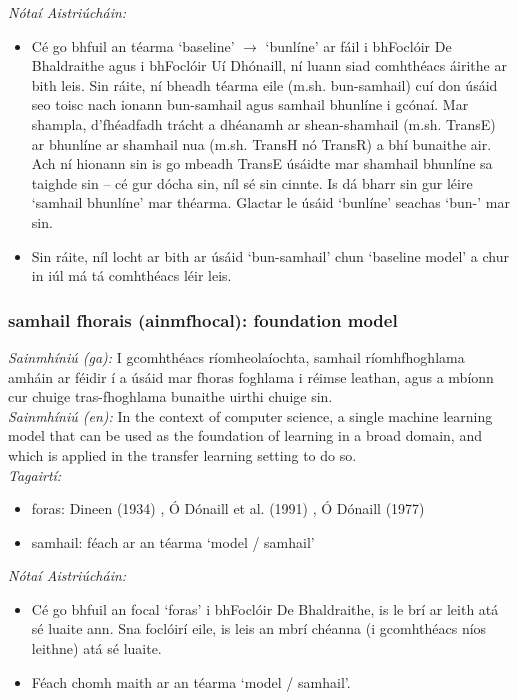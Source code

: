  \noindent \textit{Nótaí Aistriúcháin:}
\begin{itemize}
	\item Cé go bhfuil an téarma `baseline' $\rightarrow$ `bunlíne' ar fáil i bhFoclóir De Bhaldraithe agus i bhFoclóir Uí Dhónaill, ní luann siad comhthéacs áirithe ar bith leis. Sin ráite, ní bheadh téarma eile (m.sh. bun-samhail) cuí don úsáid seo toisc nach ionann bun-samhail agus samhail bhunlíne i gcónaí. Mar shampla, d'fhéadfadh trácht a dhéanamh ar shean-shamhail (m.sh. TransE) ar bhunlíne ar shamhail nua (m.sh. TransH nó TransR) a bhí bunaithe air. Ach ní hionann sin is go mbeadh TransE úsáidte mar shamhail bhunlíne sa taighde sin -- cé gur dócha sin, níl sé sin cinnte. Is dá bharr sin gur léire `samhail bhunlíne' mar théarma. Glactar le úsáid `bunlíne' seachas `bun-' mar sin.
	\item Sin ráite, níl locht ar bith ar úsáid `bun-samhail' chun `baseline model' a chur in iúl má tá comhthéacs léir leis.
\end{itemize}


\subsubsection*{samhail fhorais (ainmfhocal): foundation model}
 \noindent \textit{Sainmhíniú (ga):} I gcomhthéacs ríomheolaíochta, samhail ríomhfhoghlama amháin ar féidir í a úsáid mar fhoras foghlama i réimse leathan, agus a mbíonn cur chuige tras-fhoghlama bunaithe uirthi chuige sin.
\\
 \noindent \textit{Sainmhíniú (en):} In the context of computer science, a single machine learning model that can be used as the foundation of learning in a broad domain, and which is applied in the transfer learning setting to do so.
\\
 \noindent \textit{Tagairtí:}
\begin{itemize}
	\item foras: Dineen (1934) \cite{dineen}, Ó Dónaill et al. (1991) \cite{focloir-beag}, Ó Dónaill (1977) \cite{odonaill}
	\item samhail: féach ar an téarma `model / samhail'
\end{itemize}

 \noindent \textit{Nótaí Aistriúcháin:}
\begin{itemize}
	\item Cé go bhfuil an focal `foras' i bhFoclóir De Bhaldraithe, is le brí ar leith atá sé luaite ann. Sna foclóirí eile, is leis an mbrí chéanna (i gcomhthéacs níos leithne) atá sé luaite.
	\item Féach chomh maith ar an téarma `model / samhail'.
\end{itemize}


